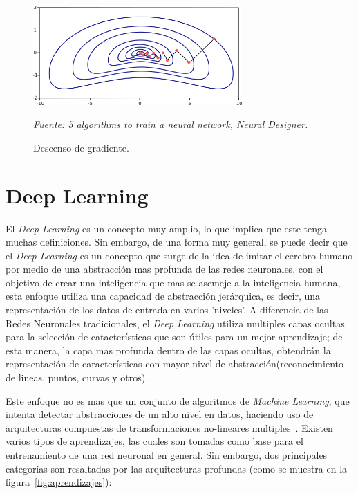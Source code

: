 \begin{figure}[H]
		\centering
		\includegraphics[width=80mm]{Imagenes/back_propagation.png}
		\caption{Descenso de gradiente.}
		\vspace{0.15cm}
		\textit{Fuente: 5 algorithms to train a neural network, Neural Designer.}
		\label{fig:back_propagation}
\end{figure}


\section{Deep Learning}
\label{sec:deep-learning}
El \textit{Deep Learning} es un concepto muy amplio, lo que implica que este tenga muchas definiciones. Sin embargo, de una forma muy general, se puede decir que el \textit{Deep Learning} es un concepto que surge de la idea de imitar el cerebro humano por medio de una abstracción mas profunda de las redes neuronales, con el objetivo de crear una inteligencia que mas se asemeje a la inteligencia humana, esta enfoque utiliza una capacidad de abstracción jerárquica, es decir, una representación de los datos de entrada en varios 'niveles'. A diferencia de las Redes Neuronales tradicionales, el \textit{Deep Learning} utiliza multiples capas ocultas para la selección de catacterísticas que son útiles para un mejor aprendizaje; de esta manera, la capa mas profunda dentro de las capas ocultas, obtendrán la representación de características con mayor nivel de abstracción(reconocimiento de lineas, puntos, curvas y otros).

Este enfoque no es mas que un conjunto de algoritmos de \textit{Machine Learning}, que intenta detectar abstracciones de un alto nivel en datos, haciendo uso de arquitecturas compuestas de transformaciones no-lineares multiples~\cite{17bengio2013representation}. Existen varios tipos de aprendizajes, las cuales son tomadas como base para el entrenamiento de una red neuronal en general. Sin embargo, dos principales categorías son resaltadas por las arquitecturas profundas (como se muestra en la figura~\ref{fig:aprendizajes}):

